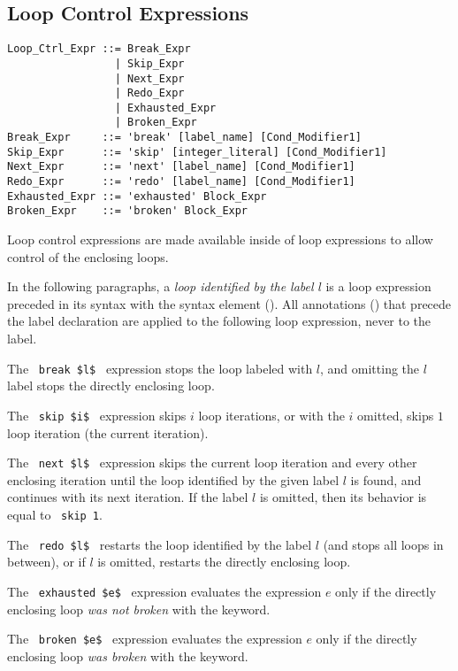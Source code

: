 \subsection{Loop Control Expressions}
\label{sec:loop-control-expressions}

\syntax\begin{lstlisting}
Loop_Ctrl_Expr ::= Break_Expr
                 | Skip_Expr
                 | Next_Expr
                 | Redo_Expr
                 | Exhausted_Expr
                 | Broken_Expr
Break_Expr     ::= 'break' [label_name] [Cond_Modifier1]
Skip_Expr      ::= 'skip' [integer_literal] [Cond_Modifier1]
Next_Expr      ::= 'next' [label_name] [Cond_Modifier1]
Redo_Expr      ::= 'redo' [label_name] [Cond_Modifier1]
Exhausted_Expr ::= 'exhausted' Block_Expr
Broken_Expr    ::= 'broken' Block_Expr
\end{lstlisting}

Loop control expressions are made available inside of loop expressions to allow control of the enclosing loops.

In the following paragraphs, a {\em loop identified by the label $l$} is a loop expression preceded in its syntax with the syntax element  (). All annotations () that precede the label declaration are applied to the following loop expression, never to the label. 

The ~\lstinline!break $l$!~ expression stops the loop labeled with $l$, and omitting the $l$ label stops the directly enclosing loop. 

The ~\lstinline!skip $i$!~ expression skips $i$ loop iterations, or with the $i$ omitted, skips $1$ loop iteration (the current iteration). 

The ~\lstinline!next $l$!~ expression skips the current loop iteration and every other enclosing iteration until the loop identified by the given label $l$ is found, and continues with its next iteration. If the label $l$ is omitted, then its behavior is equal to ~\lstinline!skip 1!. 

The ~\lstinline!redo $l$!~ restarts the loop identified by the label $l$ (and stops all loops in between), or if $l$ is omitted, restarts the directly enclosing loop. 

The ~\lstinline!exhausted $e$!~ expression evaluates the expression $e$ only if the directly enclosing loop {\em was not broken} with the  keyword. 

The ~\lstinline!broken $e$!~ expression evaluates the expression $e$ only if the directly enclosing loop {\em was broken} with the  keyword. 

